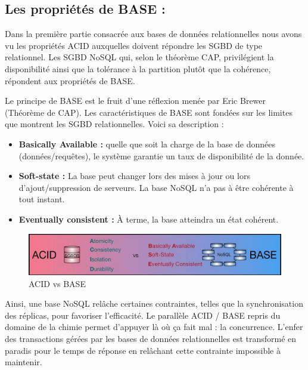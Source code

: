 \subsection{Les propriétés de BASE : }
Dans la première partie consacrée aux bases de données relationnelles nous avons vu les propriétés ACID auxquelles doivent répondre les SGBD de type relationnel. Les SGBD NoSQL qui, selon le théorème CAP, privilégient la disponibilité ainsi que la tolérance à la partition plutôt que la cohérence, répondent aux propriétés de BASE.

Le principe de BASE est le fruit d’une réflexion menée par Eric Brewer (Théorème de CAP). Les caractéristiques de BASE sont fondées sur les limites que montrent les SGBD relationnelles. Voici sa description :
\begin{itemize}[label=\textbullet]
\item \textbf{Basically Available :} quelle que soit la charge de la base de données (données/requêtes), le système garantie un taux de disponibilité de la donnée.
\item \textbf{Soft-state :} La base peut changer lors des mises à jour ou lors d'ajout/suppression de serveurs. La base NoSQL n'a pas à être cohérente à tout instant.
\item \textbf{Eventually consistent :} À terme, la base atteindra un état cohérent.
\end{itemize}

\begin{figure}[h]
	\centering
    \includegraphics[scale=0.5]{img/part1/4.2}
    \caption{ACID vs BASE}
\end{figure}

Ainsi, une base NoSQL relâche certaines contraintes, telles que la synchronisation des réplicas, pour favoriser l'efficacité. Le parallèle ACID / BASE repris du domaine de la chimie permet d'appuyer là où ça fait mal : la concurrence. L'enfer des transactions gérées par les bases de données relationnelles est transformé en paradis pour le temps de réponse en relâchant cette contrainte impossible à maintenir.